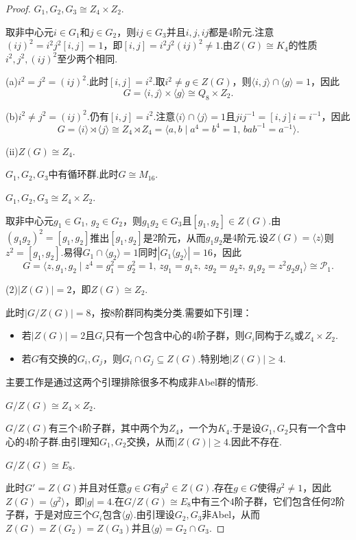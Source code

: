 \begin{proof}
	{\color{IndianRed}\bullet$G_1,G_2,G_3\cong Z_4\times Z_2$}.

	取非中心元$i\in G_1$和$j\in G_2$，则$ij\in G_3$并且$i,j,ij$都是$4$阶元.注意$(ij)^2=i^2j^2[i,j]=1$，即$[i,j]=i^2j^2(ij)^2\ne 1$.由$Z(G)\cong K_4$的性质$i^2,j^2,(ij)^2$至少两个相同.
	
	(a)$i^2=j^2=(ij)^2$.此时$[i,j]=i^2$.取$i^2\ne g\in Z(G)$，则$\langle i,j\rangle\cap\langle g\rangle=1$，因此
	\[
		G=\langle i,j\rangle\times\langle g\rangle\cong Q_8\times Z_2.
	\]

	(b)$i^2\ne j^2=(ij)^2$.仍有$[i,j]=i^2$.注意$\langle i\rangle\cap\langle j\rangle =1$且$jij^{-1}=[i,j]i=i^{-1}$，因此
	\[
		G=\langle i\rangle\rtimes\langle j\rangle\cong Z_4\rtimes Z_4=\langle a,b\mid a^4=b^4=1,\,bab^{-1}=a^{-1}\rangle.
	\]

	{\color{CornflowerBlue}(ii)$Z(G)\cong Z_4$}.

	{\color{IndianRed}\bullet$G_1,G_2,G_3$中有循环群}.此时$G\cong M_{16}$.

	{\color{IndianRed}\bullet$G_1,G_2,G_3\cong Z_4\times Z_2$}.

	取非中心元$g_1\in G_1,\,g_2\in G_2$，则$g_1g_2\in G_3$且$[g_1,g_2]\in Z(G)$.由$(g_1g_2)^2=[g_1,g_2]$推出$[g_1,g_2]$是$2$阶元，从而$g_1g_2$是$4$阶元.设$Z(G)=\langle z\rangle $则$z^2=[g_1,g_2]$.易得$G_1\cap\langle g_2\rangle=1$同时$|G_1\langle g_2\rangle |=16$，因此
	\[
		G=\langle z,g_1,g_2\mid z^4=g_1^2=g_2^2=1,\,zg_1=g_1z,\,zg_2=g_2z,\,g_1g_2=z^2g_2g_1\rangle\cong\mathcal{P}_1.
	\]

	{\color{Goldenrod}(2)$|Z(G)|=2$，即$Z(G)\cong Z_2$}.

	此时$|G/Z(G)|=8$，按$8$阶群同构类分类.需要如下引理：
	\begin{itemize}
		\item 若$|Z(G)|=2$且$G_i$只有一个包含中心的$4$阶子群，则$G_i$同构于$Z_8$或$Z_4\times Z_2$.
		\item 若$G$有交换的$G_i,G_j$，则$G_i\cap G_j\subseteq Z(G)$.特别地$|Z(G)|\ge 4$.
	\end{itemize}
	主要工作是通过这两个引理排除很多不构成非Abel群的情形.

	{\color{IndianRed}\bullet$G/Z(G)\cong Z_4\times Z_2$}.

	$G/Z(G)$有三个$4$阶子群，其中两个为$Z_4$，一个为$K_4$.于是设$G_1,G_2$只有一个含中心的$4$阶子群.由引理知$G_1,G_2$交换，从而$|Z(G)|\ge 4$.因此不存在.

	{\color{IndianRed}\bullet$G/Z(G)\cong E_8$}.

	此时$G'=Z(G)$并且对任意$g\in G$有$g^2\in Z(G)$.存在$g\in G$使得$g^2\ne 1$，因此$Z(G)=\langle g^2\rangle $，即$|g|=4$.在$G/Z(G)\cong E_8$中有三个$4$阶子群，它们包含任何$2$阶子群，于是对应三个$G_i$包含$\langle g\rangle $.由引理设$G_2,G_3$非Abel，从而$Z(G)=Z(G_2)=Z(G_3)$并且$\langle g\rangle=G_2\cap G_3$.


\end{proof}
